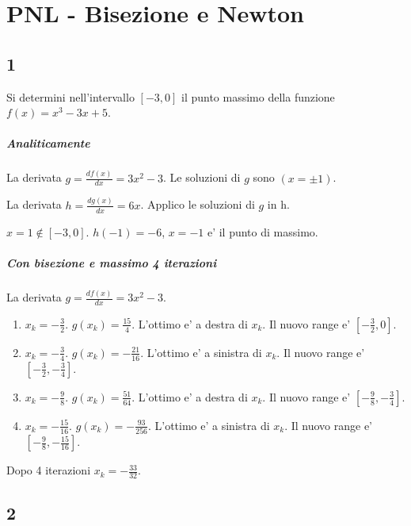 \chapter{PNL - Bisezione e Newton}

\section{1}

Si determini nell'intervallo $[-3, 0]$ il punto massimo della funzione $f(x) = x^3 - 3x + 5$.

\paragraph{Analiticamente}

La derivata $g = \frac {df(x)} {dx} = 3x^2 - 3$. Le soluzioni di $g$ sono $(x = \pm 1)$.

La derivata $h = \frac {dg(x)} {dx} = 6x$. Applico le soluzioni di $g$ in h.

$x = 1 \notin [-3, 0]$. $h(-1) = -6$, $x=-1$ e' il punto di massimo.

\paragraph{Con bisezione e massimo 4 iterazioni}

La derivata $g = \frac {df(x)} {dx} = 3x^2 - 3$.

\begin{enumerate}
    \item $x_k = - \frac 3 2$. $g(x_k) = \frac {15} 4$. L'ottimo e' a destra di $x_k$. Il nuovo range e' $[- \frac 3 2, 0]$.
    \item $x_k = - \frac 3 4$. $g(x_k) = -\frac {21} {16}$. L'ottimo e' a sinistra di $x_k$. Il nuovo range e' $[-\frac 3 2, -\frac 3 4]$.
    \item $x_k = - \frac {9} 8$. $g(x_k) = \frac {51} {64}$. L'ottimo e' a destra di $x_k$. Il nuovo range e' $[-\frac {9} {8}, -\frac {3} {4}]$.
    \item $x_k = - \frac {15} {16}$. $g(x_k) = -\frac {93} {256}$. L'ottimo e' a sinistra di $x_k$. Il nuovo range e' $[-\frac {9} {8}, -\frac {15} {16}]$.
\end{enumerate}

Dopo 4 iterazioni $x_k = -\frac {33} {32}$.

\section{2}


